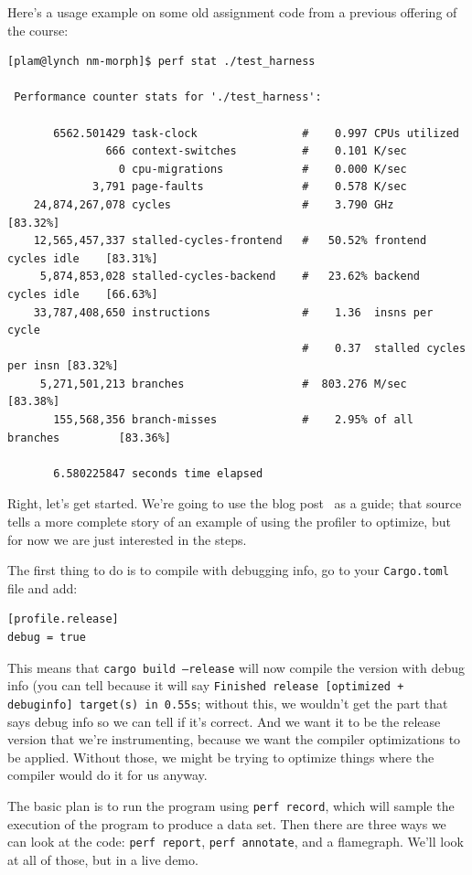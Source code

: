 \documentclass[a4paper]{report}
\begin{document}
\noindent
Here's a usage example on some old assignment code from a previous offering of the course:
\begin{lstlisting}[basicstyle=\scriptsize]
[plam@lynch nm-morph]$ perf stat ./test_harness

 Performance counter stats for './test_harness':

       6562.501429 task-clock                #    0.997 CPUs utilized          
               666 context-switches          #    0.101 K/sec                  
                 0 cpu-migrations            #    0.000 K/sec                  
             3,791 page-faults               #    0.578 K/sec                  
    24,874,267,078 cycles                    #    3.790 GHz                     [83.32%]
    12,565,457,337 stalled-cycles-frontend   #   50.52% frontend cycles idle    [83.31%]
     5,874,853,028 stalled-cycles-backend    #   23.62% backend  cycles idle    [66.63%]
    33,787,408,650 instructions              #    1.36  insns per cycle        
                                             #    0.37  stalled cycles per insn [83.32%]
     5,271,501,213 branches                  #  803.276 M/sec                   [83.38%]
       155,568,356 branch-misses             #    2.95% of all branches         [83.36%]

       6.580225847 seconds time elapsed
\end{lstlisting} %

Right, let's get started. We're going to use the blog post~\cite{rustflamegraph} as a guide; that source tells a more complete story of an example of using the profiler to optimize, but for now we are just interested in the steps.

The first thing to do is to compile with debugging info, go to your \texttt{Cargo.toml} file and add:
\begin{verbatim}
[profile.release]
debug = true
\end{verbatim}

This means that \texttt{cargo build --release} will now compile the version with debug info (you can tell because it will say \texttt{Finished release [optimized + debuginfo] target(s) in 0.55s}; without this, we wouldn't get the part that says debug info so we can tell if it's correct. And we want it to be the release version that we're instrumenting, because we want the compiler optimizations to be applied. Without those, we might be trying to optimize things where the compiler would do it for us anyway.

The basic plan is to run the program using \texttt{perf record}, which will sample the execution of the program to produce a data set. Then there are three ways we can look at the code: \texttt{perf report}, \texttt{perf annotate}, and a flamegraph. We'll look at all of those, but in a live demo.
\end{document}
